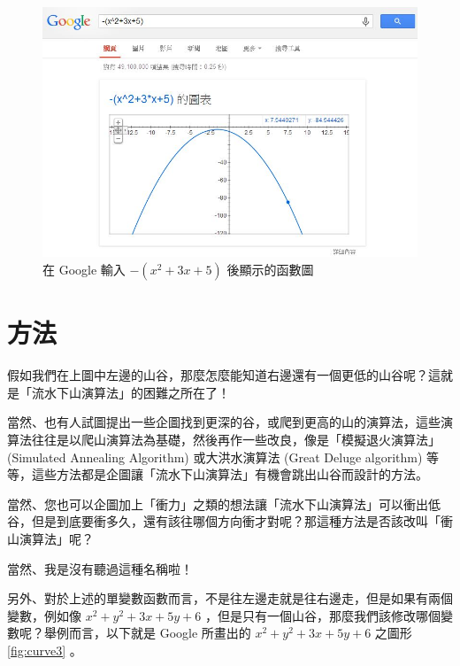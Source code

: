 \begin{figure}
  \includegraphics[width=\linewidth]{img/GoogleGraph2DMountain.jpg}
  \caption{在 Google 輸入 $-(x^2+3x+5)$ 後顯示的函數圖}
  \label{fig:curve2}
\end{figure}

\section{方法}


假如我們在上圖中左邊的山谷，那麼怎麼能知道右邊還有一個更低的山谷呢？這就是「流水下山演算法」的困難之所在了！

當然、也有人試圖提出一些企圖找到更深的谷，或爬到更高的山的演算法，這些演算法往往是以爬山演算法為基礎，然後再作一些改良，像是「模擬退火演算法」(Simulated Annealing Algorithm) 或大洪水演算法 (Great Deluge algorithm) 等等，這些方法都是企圖讓「流水下山演算法」有機會跳出山谷而設計的方法。

當然、您也可以企圖加上「衝力」之類的想法讓「流水下山演算法」可以衝出低谷，但是到底要衝多久，還有該往哪個方向衝才對呢？那這種方法是否該改叫「衝山演算法」呢？

當然、我是沒有聽過這種名稱啦！

另外、對於上述的單變數函數而言，不是往左邊走就是往右邊走，但是如果有兩個變數，例如像  $x^2+y^2+3x+5y+6$  ，但是只有一個山谷，那麼我們該修改哪個變數呢？舉例而言，以下就是 Google 所畫出的  $x^2+y^2+3x+5y+6$  之圖形  \ref{fig:curve3} 。

